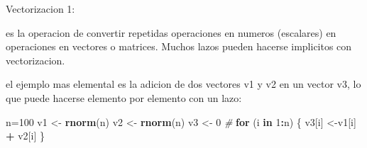 \documentclass[ignorenonframetext,]{beamer}
\newenvironment{Shaded}{\begin{snugshade}}{\end{snugshade}}
\newcommand{\KeywordTok}[1]{\textcolor[rgb]{0.13,0.29,0.53}{\textbf{#1}}}
\newcommand{\DecValTok}[1]{\textcolor[rgb]{0.00,0.00,0.81}{#1}}
\newcommand{\StringTok}[1]{\textcolor[rgb]{0.31,0.60,0.02}{#1}}
\newcommand{\CommentTok}[1]{\textcolor[rgb]{0.56,0.35,0.01}{\textit{#1}}}
\newcommand{\ControlFlowTok}[1]{\textcolor[rgb]{0.13,0.29,0.53}{\textbf{#1}}}
\newcommand{\OperatorTok}[1]{\textcolor[rgb]{0.81,0.36,0.00}{\textbf{#1}}}
\newcommand{\NormalTok}[1]{#1}
\begin{document}
\begin{frame}[fragile]

\begin{block}{Vectorizacion 1:}

es la operacion de convertir repetidas operaciones en numeros
(escalares) en operaciones en vectores o matrices. Muchos lazos pueden
hacerse implicitos con vectorizacion.

el ejemplo mas elemental es la adicion de dos vectores v1 y v2 en un
vector v3, lo que puede hacerse elemento por elemento con un lazo:

\begin{Shaded}
\begin{Highlighting}[]
\NormalTok{n=}\DecValTok{100}
\NormalTok{v1 <-}\StringTok{ }\KeywordTok{rnorm}\NormalTok{(n)}
\NormalTok{v2 <-}\StringTok{ }\KeywordTok{rnorm}\NormalTok{(n)  }
\NormalTok{v3 <-}\StringTok{ }\DecValTok{0}
\CommentTok{#  }
\ControlFlowTok{for}\NormalTok{ (i }\ControlFlowTok{in} \DecValTok{1}\OperatorTok{:}\NormalTok{n)}
\NormalTok{\{}
\NormalTok{v3[i] <-v1[i] }\OperatorTok{+}\StringTok{ }\NormalTok{v2[i]}
\NormalTok{\}}
\end{Highlighting}
\end{Shaded}

\end{block}

\end{frame}
\end{document}
